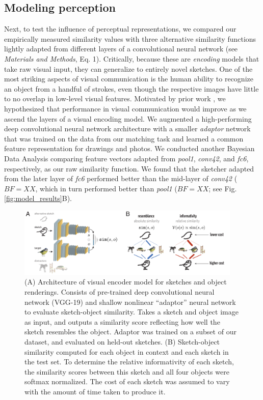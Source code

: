 \documentclass[9pt,twocolumn,twoside]{pnas-new}
\begin{document}
\subsection*{Modeling perception}
Next, to test the influence of perceptual representations, we compared our empirically measured similarity values with three alternative similarity functions lightly adapted from different layers of a convolutional neural network (see \emph{Materials and Methods}, Eq. 1). Critically, because these are \emph{encoding} models that take raw visual input, they can generalize to entirely novel sketches. One of the most striking aspects of visual communication is the human ability to recognize an object from a handful of strokes, even though the respective images have little to no overlap in low-level visual features. Motivated by prior work \cite{fan2015common}, we hypothesized that performance in visual communication would improve as we ascend the layers of a visual encoding model.  We augmented a high-performing deep convolutional neural network architecture with a smaller \emph{adaptor} network that was trained on the data from our matching task and learned a common feature representation for drawings and photos. We conducted another Bayesian Data Analysis comparing feature vectors adapted from \emph{pool1}, \emph{conv42}, and \emph{fc6}, respectively, as our raw similarity function. We found that the sketcher adapted from the later layer of \emph{fc6} performed better than the mid-layer of \emph{conv42} ($BF= XX$, which in turn performed better than \emph{pool1} ($BF = XX$; see Fig. \ref{fig:model_results}B).

\begin{figure}[htbp]
\centering
\includegraphics[width=0.95\textwidth]{figures/4_model_schematic.pdf}
\caption{(A) Architecture of visual encoder model for sketches and object renderings. Consists of pre-trained deep convolutional neural network (VGG-19) and shallow nonlinear ``adaptor'' neural network to evaluate sketch-object similarity. Takes a sketch and object image as input, and outputs a similarity score reflecting how well the sketch resembles the object. Adaptor was trained on a subset of our dataset, and evaluated on held-out sketches. (B) Sketch-object similarity computed for each object in context and each sketch in the test set. To determine the relative informativity of each sketch, the similarity scores between this sketch and all four objects were softmax normalized. The cost of each sketch was assumed to vary with the amount of time taken to produce it.}
\label{task_performance}
\end{figure}
\end{document}

